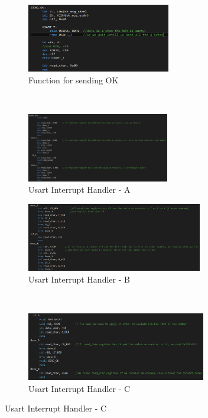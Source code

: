 \documentclass{article}
\begin{document}
\begin{figure}[h!]
		\begin{subfigure}[t]{0.5\textwidth}
			\centering
			\includegraphics[height=3cm, width=\textwidth]{./results/lab3_send_ok.png}
			\caption{Function for sending OK}
		\end{subfigure}%
		~
		\begin{subfigure}[t]{0.5\textwidth}
			\centering
			\includegraphics[height=3cm, width=\textwidth]{./results/lab3_usart_handler_a.png}
			\caption{Usart Interrupt Handler - A}
		\end{subfigure}	
	
		\begin{subfigure}[t]{0.5\textwidth}
			\centering
			\includegraphics[height=3cm, width=\linewidth]{./results/lab3_usart_handler_b.png}
			\caption{Usart Interrupt Handler - B}
		\end{subfigure}%
		~
		\begin{subfigure}[t]{0.5\textwidth}
			\centering
			\includegraphics[height=3cm, width=\linewidth]{./results/lab3_usart_handler_c.png}
			\caption{Usart Interrupt Handler - C}
		\end{subfigure}	
	\end{figure}
	
\end{document}

